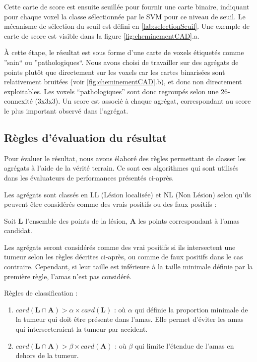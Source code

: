 Cette carte de score est ensuite seuillée pour fournir une carte binaire, indiquant pour chaque voxel la classe sélectionnée par le SVM pour ce niveau de seuil. Le mécanisme de sélection du seuil est défini en \ref{lab:selectionSeuil}. Une exemple de carte de score est visible dans la figure \ref{fig:cheminementCAD}.a.
	
\`A cette étape, le résultat est sous forme d'une carte de voxels étiquetés comme ''sain`` ou ''pathologiques``. Nous avons choisi de travailler sur des agrégats de points plutôt que directement sur les voxels car les cartes binarisées sont relativement bruitées (voir \ref{fig:cheminementCAD}.b), et donc non directement exploitables. Les voxels ``pathologiques'' sont donc regroupés selon une 26-connexité (3x3x3). Un score est associé à chaque  agrégat, correspondant au score le plus important observé dans l'agrégat.

\subsection{Règles d'évaluation du résultat}
\label{lab:reglesSelect}
Pour évaluer le résultat, nous avons élaboré des règles permettant de classer les agrégats à l'aide de la vérité terrain. Ce sont ces algorithmes qui sont utilisés dans les évaluateurs de performances présentés ci-après.

Les agrégats sont classés en LL (Lésion localisée) et NL (Non Lésion) selon qu'ils peuvent être considérés comme des vrais positifs ou des faux positifs :

Soit $\mathbf{L}$ l'ensemble des points de la lésion, $\mathbf{A}$ les points correspondant à l'amas candidat.

Les agrégats seront considérés comme des vrai positifs si ils intersectent une tumeur selon les règles décrites ci-après, ou comme de faux positifs dans le cas contraire. Cependant, si leur taille est inférieure à la taille minimale définie par la première règle, l'amas n'est pas considéré.

Règles de classification :
\begin{enumerate}
 \item $card( \mathbf{L} \cap \mathbf{A} ) > \alpha \times card( \mathbf{L} )$ : où $\alpha$ qui définie la proportion minimale de la tumeur qui doit être présente dans l'amas. Elle permet d'éviter les amas qui intersecteraient la tumeur par accident.
 \item $card( \mathbf{L} \cap \mathbf{A} ) > \beta \times card( \mathbf{A} )$ : où $\beta$ qui limite l'étendue de l'amas en dehors de la tumeur.
\end{enumerate}

